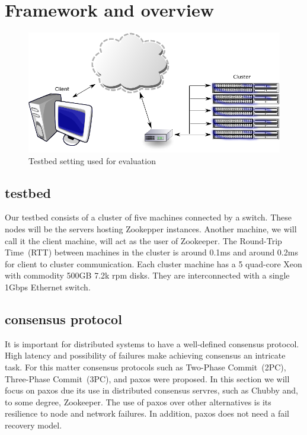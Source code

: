 \section{Framework and overview}\label{sec:framework}

\begin{figure}[h]
\centering
\includegraphics[scale=0.85]{img/framework.eps}
\caption{Testbed setting used for evaluation}
\label{fig:framework}
\end{figure}

\subsection{testbed}
Our testbed consists of a cluster of five machines connected by a switch. These nodes will be the servers hosting Zookepper instances. Another machine, we will call it the client machine, will act as the user of Zookeeper. The Round-Trip Time~(RTT) between machines in the cluster is around 0.1ms and around 0.2ms for client to cluster communication. Each cluster machine has a 5 quad-core Xeon  with commodity 500GB 7.2k rpm disks. They are interconnected with a single 1Gbps Ethernet switch.

\subsection{consensus protocol}
It is important for distributed systems to have a well-defined consensus protocol. High latency and possibility of failures make achieving consensus an intricate task. For this matter consensus protocols such as Two-Phase Commit~(2PC), Three-Phase Commit~(3PC), and paxos were proposed. In this section we will focus on paxos due its use in distributed consensus servres, such as Chubby and, to some degree, Zookeeper. The use of paxos over other alternatives is its resilience to node and network failures. In addition, paxos does not need a fail recovery model.

